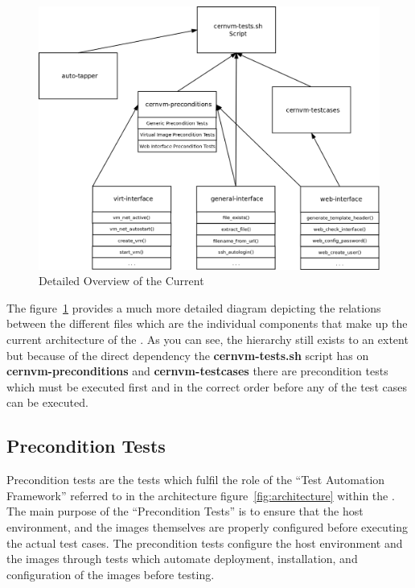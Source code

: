 \begin{figure}[hbp]
	\begin{center}
		\includegraphics[scale=0.25]{img/detailed_framework.png}
	\end{center}
	\caption{Detailed Overview of the Current \cernvmtestframework}
	\label{fig:detailedarchitecture}
\end{figure}

The figure~\ref{fig:detailedarchitecture} provides a much more detailed diagram depicting the relations between the different files which are the
individual components that make up the current architecture of the \cernvmtestframework. As you can see, the hierarchy still exists to an extent
but because of the direct dependency the {\bf cernvm-tests.sh} script has on {\bf cernvm-preconditions} and {\bf cernvm-testcases} there are
precondition tests which must be executed first and in the correct order before any of the test cases can be executed.




\subsection{Precondition Tests}
\label{sct:preconditiontests}

Precondition tests are the tests which fulfil the role of the ``Test Automation Framework'' referred to in the \tapper architecture
figure~\ref{fig:architecture} within the \cernvmtestframework. The main purpose of the ``Precondition Tests'' is to ensure that the
host environment, and the \cernvm images themselves are properly configured before executing the actual \cernvmreleasetesting test
cases. The precondition tests configure the host environment and the \cernvm images through tests which automate deployment, 
installation, and configuration of the \cernvm images before testing.

